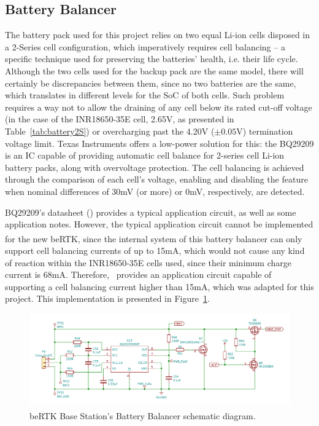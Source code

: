 \subsection{Battery Balancer}\label{sec:3212_BQ29209}

The battery pack used for this project relies on two equal Li-ion cells disposed in a 2-Series cell configuration, which imperatively requires cell balancing -- a specific technique used for preserving the batteries' health, i.e. their life cycle. Although the two cells used for the backup pack are the same model, there will certainly be discrepancies between them, since no two batteries are the same, which translates in different levels for the \gls{SoC} of both cells. Such problem requires a way not to allow the draining of any cell below its rated cut-off voltage (in the case of the INR18650-35E cell, 2.65V, as presented in Table~\ref{tab:battery2S}) or overcharging past the 4.20V ($\pm0.05$V) termination voltage limit. Texas Instruments offers a low-power solution for this: the BQ29209 is an IC capable of providing automatic cell balance for 2-series cell Li-ion battery packs, along with overvoltage protection. The cell balancing is achieved through the comparison of each cell's voltage, enabling and disabling the feature when nominal differences of 30mV (or more) or 0mV, respectively, are detected.

BQ29209's datasheet (\cite{bq29209}) provides a typical application circuit, as well as some application notes. However, the typical application circuit cannot be implemented for the new beRTK\textsuperscript{\textregistered}, since the internal system of this battery balancer can only support cell balancing currents of up to 15mA, which would not cause any kind of reaction within the INR18650-35E cells used, since their minimum charge current is 68mA. Therefore,~\cite{bq29209} provides an application circuit capable of supporting a cell balancing current higher than 15mA, which was adapted for this project. This implementation is presented in Figure~\ref{fig:BQ29209_circuit}. %

\begin{figure}[H]
    \centering
    \includegraphics[width=1.0\textwidth]{Chapters/Figures/chapter3/Battery_Balancer.pdf}
    \caption{beRTK\textsuperscript{\textregistered} Base Station's Battery Balancer schematic diagram.}
    \label{fig:BQ29209_circuit}
\end{figure}


